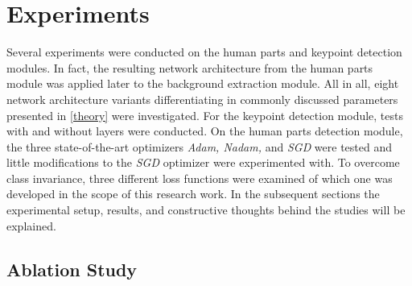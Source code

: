 

\chapter{Experiments} %

\label{experiments} %
Several experiments were conducted on the human parts and keypoint detection modules.
In fact, the resulting network architecture from the human parts module was applied later to the background extraction module.
All in all, eight network architecture variants differentiating in commonly discussed parameters presented in \autoref{theory}
were investigated.
For the keypoint detection module, tests with and without  layers were conducted.
On the human parts detection module, the three state-of-the-art optimizers \textit{Adam, Nadam,} and \textit{SGD} were tested and little
modifications to the \textit{SGD} optimizer were experimented with.
To overcome class invariance, three different loss functions were examined of which one was developed in the scope of
this research work.
In the subsequent sections the experimental setup, results, and constructive thoughts behind the studies will be
explained.



\section{Ablation Study}




